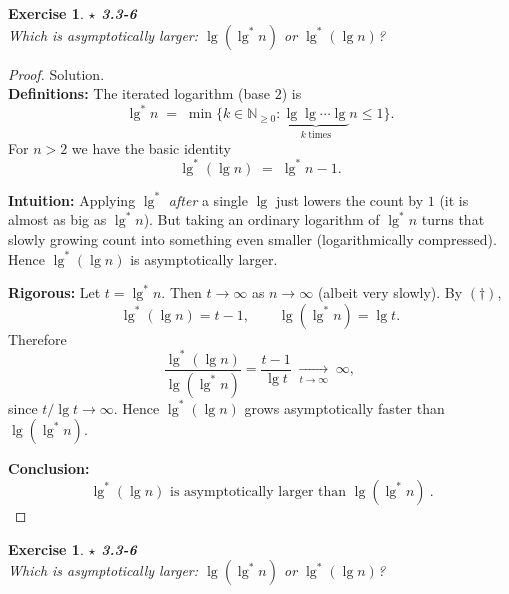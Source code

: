 \documentclass[12pt]{article}
\newtheorem{exercise}[theorem]{Exercise}
\theoremstyle{definition}
\begin{document}
\newpage

\begin{exercise}
\noindent
\textbf{$\star$ 3.3-6} \\
Which is asymptotically larger: $\lg(\lg^{*} n)$ or $\lg^{*}(\lg n)$?
\end{exercise}

\begin{proof}
Solution. \\

\noindent
\textbf{Definitions:}
The iterated logarithm (base $2$) is
\[
\lg^{*} n \;=\; \min\{k\in\mathbb{N}_{\ge 0} : \underbrace{\lg\lg\cdots\lg}_{k\ \text{times}} n \le 1\}.
\]
For $n>2$ we have the basic identity
\[
\lg^{*}(\lg n) \;=\; \lg^{*} n - 1.
\tag{$\dagger$}
\]

\noindent
\textbf{Intuition:}
Applying $\lg^{*}$ \emph{after} a single $\lg$ just lowers the count by $1$ (it is almost as big as $\lg^{*} n$).
But taking an ordinary logarithm of $\lg^{*} n$ turns that slowly growing count into something
even smaller (logarithmically compressed). Hence $\lg^{*}(\lg n)$ is asymptotically larger.

\noindent
\textbf{Rigorous:}
Let $t=\lg^{*} n$. Then $t\to\infty$ as $n\to\infty$ (albeit very slowly). By $(\dagger)$,
\[
\lg^{*}(\lg n)=t-1,
\qquad
\lg(\lg^{*} n)=\lg t.
\]
Therefore
\[
\frac{\lg^{*}(\lg n)}{\lg(\lg^{*} n)}
=\frac{t-1}{\lg t}
\;\xrightarrow[t\to\infty]{}\;\infty,
\]
since $t/\lg t\to\infty$. Hence $\lg^{*}(\lg n)$ grows asymptotically faster than $\lg(\lg^{*} n)$.

\medskip
\noindent
\textbf{Conclusion:}
\[
\boxed{\ \lg^{*}(\lg n) \text{ is asymptotically larger than } \lg(\lg^{*} n)\ }.
\]
\end{proof}

\newpage

\begin{exercise}
\noindent
\textbf{$\star$ 3.3-6} \\
Which is asymptotically larger: $\lg(\lg^{*} n)$ or $\lg^{*}(\lg n)$?
\end{exercise}
\end{document}
